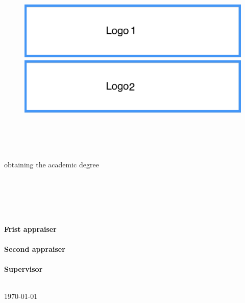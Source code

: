 \thispagestyle{empty}

\begin{figure}[htb]
    \centering
    \begin{minipage}[t]{0.45\linewidth}
        \centering
        \includegraphics[width=\linewidth]{figures/coversheet/logo1.png}
    \end{minipage}
    \hfill
    \begin{minipage}[t]{0.45\linewidth}
        \centering
        \includegraphics[width=\linewidth]{figures/coversheet/logo2.png}
    \end{minipage}
\end{figure}
\vspace{12mm}


\begin{center}
\LARGE{\textbf{\thesisTitle}}\\
\large{\thesisType} \\
\vspace{12mm}
\textbf{\degree} \\
{\mainWork}
\end{center}
\vspace{1mm}

\begin{center}
{obtaining the academic degree} \\
\textbf{\academicDegree}
\end{center}
\vspace{10mm}

\begin{center}
\Large{
{\faculty} \\
\textbf{\facultyName} \\
{\institute} \\
{\fieldOfWork} \\
}
\end{center}
\vspace{16mm}

\begin{center}
\large
\textbf{Frist appraiser} \\
\firstAppraiser \\
\vspace{4mm}
\textbf{Second appraiser} \\
\secondAppraiser \\
\vspace{4mm}
\textbf{Supervisor} \\
\supervisor \\
\end{center}
\vspace{6mm}

\begin{center}
\today
\end{center}